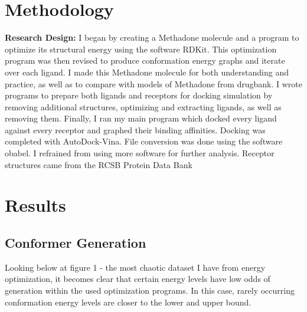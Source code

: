 \documentclass[a4paper,10pt]{article}
\begin{document}
\section{Methodology}
\small
\textbf{Research Design:}
I began by creating a Methadone molecule and a program to optimize its structural energy using the software RDKit. 
This optimization program was then revised to produce conformation energy graphs and iterate over each ligand.
I made this Methadone molecule for both understanding and practice, as well as to compare with models of Methadone from drugbank.
I wrote programs to prepare both ligands and receptors for docking simulation by removing additional structures, optimizing and extracting ligands, as well as removing them.
Finally, I ran my main program which docked every ligand against every receptor and graphed their binding affinities. Docking was completed with AutoDock-Vina. File conversion was done using the software obabel. I refrained from using more software for further analysis. Receptor structures came from the RCSB Protein Data Bank

\section{Results}
\small
\subsection{Conformer Generation}

Looking below at figure 1 - the most chaotic dataset I have from energy optimization, it becomes clear that certain energy levels have low odds of generation within the used optimization programs. In this case, rarely occurring conformation energy levels are closer to the lower and upper bound.
\end{document}
